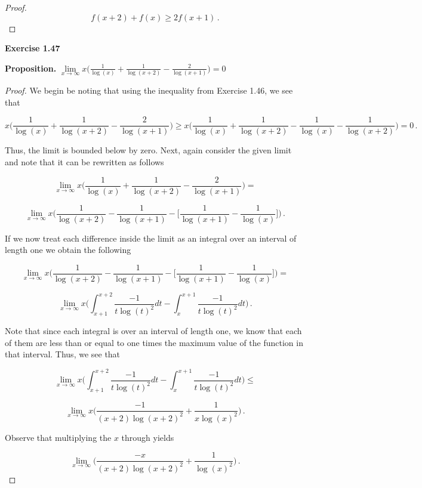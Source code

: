 \documentclass[a4paper]{article}
\numberwithin{equation}{section}
\begin{document}
\begin{description}
\begin{proof}
$$f(x+2)+f(x) \geq 2f(x+1)\,.$$

\end{proof}

\item \textbf{Exercise 1.47}

\item \textbf{Proposition.} $\lim \limits_{x \rightarrow \infty} x \Big( \frac{1}{\log(x)}  + \frac{1}{\log(x+2)} - \frac{2}{\log(x+1)}\Big) = 0$

\begin{proof} We begin be noting that using the inequality from Exercise 1.46, we see that

$$x \Big( \frac{1}{\log(x)}  + \frac{1}{\log(x+2)} - \frac{2}{\log(x+1)}\Big) \geq x \Big( \frac{1}{\log(x)}  + \frac{1}{\log(x+2)} - \frac{1}{\log(x)}  - \frac{1}{\log(x+2)}\Big) = 0\,.$$

Thus, the limit is bounded below by zero. Next, again consider the given limit and note that it can be rewritten as follows

$$\lim \limits_{x \rightarrow \infty} x \Big( \frac{1}{\log(x)}  + \frac{1}{\log(x+2)} - \frac{2}{\log(x+1)}\Big) = $$

$$\lim \limits_{x \rightarrow \infty}x \Big(\frac{1}{\log(x+2)} - \frac{1}{\log(x+1)} - \Big[\frac{1}{\log(x+1)}- \frac{1}{\log(x)}\Big] \Big)\,.$$

If we now treat each difference inside the limit as an integral over an interval of length one we obtain the following

$$\lim \limits_{x \rightarrow \infty}x \Big(\frac{1}{\log(x+2)} - \frac{1}{\log(x+1)} - \Big[\frac{1}{\log(x+1)}- \frac{1}{\log(x)}\Big] \Big) = $$

$$\lim \limits_{x \rightarrow \infty}x \Big(\int_{x+1}^{x+2}\frac{-1}{t\log(t)^2}dt - \int_{x}^{x+1}\frac{-1}{t\log(t)^2}dt \Big)\,.$$

Note that since each integral is over an interval of length one, we know that each of them are less than or equal to one times the maximum value of the function in that interval. Thus, we see that

$$\lim \limits_{x \rightarrow \infty}x \Big(\int_{x+1}^{x+2}\frac{-1}{t\log(t)^2}dt - \int_{x}^{x+1}\frac{-1}{t\log(t)^2}dt \Big) \leq $$

$$\lim \limits_{x \rightarrow \infty}x \Big(\frac{-1}{(x+2)\log(x+2)^2} + \frac{1}{x\log(x)^2} \Big)\,.$$

Observe that multiplying the $x$ through yields

$$\lim \limits_{x \rightarrow \infty} \Big(\frac{-x}{(x+2)\log(x+2)^2} + \frac{1}{\log(x)^2} \Big)\,.$$


\end{proof}
\end{description}
\end{document}
